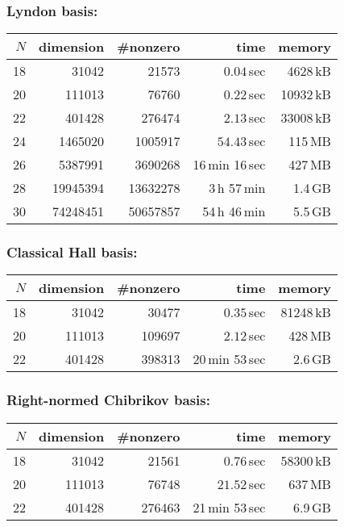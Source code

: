 \documentclass[11pt,a4paper]{article}
\begin{document}
\subsubsection*{Lyndon basis:}

\nopagebreak

\begin{center}
\begin{tabular}{rrrrr}
\hline
$N$ & dimension & \#nonzero & time  & memory \\
\hline
18 &  31042 & 21573 &  $0.04$\,sec & 4628\,kB\\
20 & 111013 & 76760 & $0.22$\,sec  & 10932\,kB \\
22 & 401428 & 276474 & $2.13$\,sec & 33008\,kB \\
24 & 1465020 & 1005917 & $54.43$\,sec  & 115\,MB\\
26 & 5387991 & 3690268 & 16\,min 16\,sec  &  427\,MB\\
28 & 19945394 & 13632278 & 3\,h 57\,min & 1.4\,GB\\
30 & 74248451 & 50657857 & 54\,h 46\,min & 5.5\,GB\\
\hline
\end{tabular}
\end{center}

\subsubsection*{Classical Hall basis:}
\begin{center}
\begin{tabular}{rrrrr}
\hline
$N$ & dimension & \#nonzero & time  & memory \\
\hline
18 & 31042 & 30477   & $0.35$\,sec & 81248\,kB\\
20 & 111013 & 109697 & $2.12$\,sec & 428\,MB \\
22 & 401428 & 398313 & 20\,min 53\,sec & 2.6\,GB\\
\hline
\end{tabular}
\end{center}

\subsubsection*{Right-normed Chibrikov basis:}
\begin{center}
\begin{tabular}{rrrrr}
\hline
$N$ & dimension & \#nonzero & time  & memory \\
\hline
18 & 31042  & 21561 & $0.76$\,sec & 58300\,kB \\
20 & 111013 & 76748 & $21.52$\,sec & 637\,MB \\
22 & 401428 & 276463 & 21\,min 53\,sec & 6.9\,GB\\
\hline
\end{tabular}
\end{center}
\end{document}
